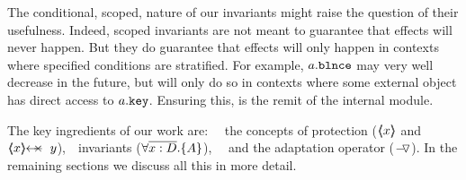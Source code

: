 The conditional, scoped,  nature of our invariants might raise the question of their usefulness.
 Indeed, scoped invariants are not meant to guarantee that effects will never happen. 
 But they do guarantee that effects will only happen in contexts where specified conditions are stratified.
 For example,   $a.\mbox{\normalfont{\texttt{\mbox{\normalfont{\texttt{blnce}}}}}}$ may very well decrease in the future, but will only do so in contexts where some external object has direct access to  $a.\mbox{\normalfont{\texttt{key}}}$. 
 Ensuring this, is the remit of the internal module.
 
 
The key ingredients of our work are: \ \ the concepts of protection ($\langle\!\!\langle x \rangle\!\!\rangle$ and $\protectedFrom {x} {y}$),\ \  \scoped invariants (${\forall {\overline {x:D}}.{{\{}}{A}{{\}}}}$), \ \  and  the adaptation operator ($ { } \!-\!\!\!\,\!{\triangledown} { } $).
 In the remaining sections we discuss all this in more detail.

 

 


 

 



 
 
